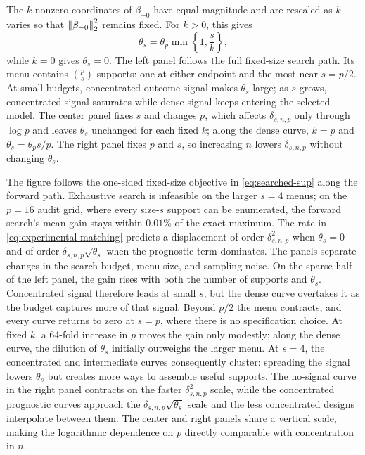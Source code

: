 The $k$ nonzero coordinates of $\beta_{-0}$ have equal magnitude and are
rescaled as $k$ varies so that $\left\lVert \beta_{-0} \right\rVert_2^2$ remains fixed. For
$k>0$, this gives
\begin{equation*}
        \theta_s
        =
        \theta_p \min\left\{1,\frac{s}{k}\right\},
\end{equation*}
while $k=0$ gives $\theta_s=0$. The left panel follows the full fixed-size
search path. Its menu contains $\binom{p}{s}$ supports: one at either endpoint
and the most near $s=p/2$. At small budgets, concentrated outcome signal makes
$\theta_s$ large; as $s$ grows, concentrated signal saturates while dense
signal keeps entering the selected model. The center panel fixes $s$ and
changes $p$, which affects $\delta_{s,n,p}$ only through $\log p$ and leaves
$\theta_s$ unchanged for each fixed $k$; along the dense curve, $k=p$ and
$\theta_s=\theta_p s/p$. The right panel fixes $p$ and $s$, so increasing $n$
lowers $\delta_{s,n,p}$ without changing $\theta_s$.

The figure follows the one-sided fixed-size objective in
\eqref{eq:searched-sup} along the forward path. Exhaustive search is infeasible
on the larger $s=4$ menus; on the $p=16$ audit grid, where every size-$s$
support can be enumerated, the forward search's mean gain stays within
$0.01\%$ of the exact maximum. The rate in
\eqref{eq:experimental-matching} predicts a displacement of order
$\delta_{s,n,p}^2$ when $\theta_s=0$ and of order
$\delta_{s,n,p}\sqrt{\theta_s}$ when the prognostic term dominates. The panels
separate changes in the search budget, menu size, and sampling noise. On the
sparse half of the left panel, the gain rises with both the number of supports
and $\theta_s$. Concentrated signal therefore leads at small $s$, but the dense
curve overtakes it as the budget captures more of that signal. Beyond $p/2$
the menu contracts, and every curve returns to zero at $s=p$, where there is
no specification choice. At fixed $k$, a 64-fold increase in $p$
moves the gain only modestly; along the dense curve, the dilution of
$\theta_s$ initially outweighs the larger menu. At $s=4$, the concentrated
and intermediate curves consequently cluster: spreading the signal lowers
$\theta_s$ but creates more ways to assemble useful supports. The no-signal curve in the
right panel contracts on the faster $\delta_{s,n,p}^2$ scale, while the
concentrated prognostic curves approach the
$\delta_{s,n,p}\sqrt{\theta_s}$ scale and the less concentrated designs
interpolate between them. The center and right panels share a vertical scale,
making the logarithmic dependence on $p$ directly comparable with concentration
in $n$.

